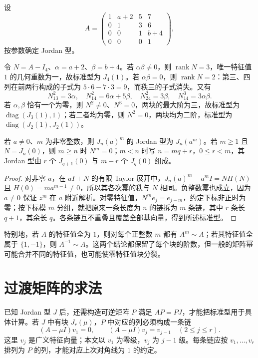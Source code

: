 \begin{example}
设
\[
 A=\begin{pmatrix}
 1&a+2&5&7\\0&1&3&6\\0&0&1&b+4\\0&0&0&1
 \end{pmatrix},
\]
按参数确定 Jordan 型。
\end{example}
\begin{solve}
令 $N=A-I_4$、$\alpha=a+2$、$\beta=b+4$。若 $\alpha\beta\ne0$，则 $\operatorname{rank}N=3$，唯一特征值 $1$ 的几何重数为一，故标准型为 $J_4(1)$。若 $\alpha\beta=0$，则 $\operatorname{rank}N=2$：第三、四列在前两行构成的子式为 $5\cdot6-7\cdot3=9$，而秩三的子式消失。又有
\[
 N^2_{13}=3\alpha,\quad N^2_{14}=6\alpha+5\beta,
 \quad N^2_{24}=3\beta,\quad N^3_{14}=3\alpha\beta.
\]
若 $\alpha,\beta$ 恰有一个为零，则 $N^2\ne0$、$N^3=0$，两块的最大阶为三，故标准型为 $\operatorname{diag}(J_3(1),1)$；若二者均为零，则 $N^2=0$，两块均为二阶，标准型为 $\operatorname{diag}(J_2(1),J_2(1))$。
\end{solve}

\begin{proposition}
\label{prop:xie-ex-sim-jordan-power}
若 $a\ne0$、$m$ 为非零整数，则 $J_n(a)^m$ 的 Jordan 型为 $J_n(a^m)$。若 $m\geq1$ 且 $N=J_n(0)$，则 $m\geq n$ 时 $N^m=0$；$m<n$ 时写 $n=mq+r$，$0\leq r<m$，其 Jordan 型由 $r$ 个 $J_{q+1}(0)$ 与 $m-r$ 个 $J_q(0)$ 组成。
\end{proposition}
\begin{proof}
对非零 $a$，在 $aI+N$ 的有限 Taylor 展开中，$J_n(a)^m-a^mI=NH(N)$ 且 $H(0)=ma^{m-1}\ne0$，所以其各次幂的秩与 $N$ 相同。负整数幂也成立，因为 $a\ne0$ 保证 $z^m$ 在 $a$ 附近解析。对零特征值，$N^me_j=e_{j-m}$，约定下标非正时为零；按下标模 $m$ 分组，就把原来一条长度为 $n$ 的链拆为 $m$ 条链，其中 $r$ 条长 $q+1$，其余长 $q$。各条链互不重叠且覆盖全部基向量，得到所述标准型。
\end{proof}

特别地，若 $A$ 的特征值全为 $1$，则对每个正整数 $m$ 都有 $A^m\sim A$；若其特征值全属于 $\{1,-1\}$，则 $A^{-1}\sim A$。这两个结论都保留了每个块的阶数，但一般的矩阵幂可能合并不同的特征值，也可能使零特征值块分裂。

\section{过渡矩阵的求法}
\label{sec:xie-ex-sim-transition}

已知 Jordan 型 $J$ 后，还需构造可逆矩阵 $P$ 满足 $AP=PJ$，才能把标准型用于具体计算。若 $J$ 中有块 $J_r(\mu)$，$P$ 中对应的列必须构成一条链
\begin{equation}
 (A-\mu I)v_1=0,\qquad
 (A-\mu I)v_j=v_{j-1}\quad(2\leq j\leq r).
 \label{eq:xie-ex-sim-chain}
\end{equation}
这里 $v_j$ 是广义特征向量；本文以 $v_1$ 为零级，$v_j$ 为 $j-1$ 级。每条链应按 $v_1,\ldots,v_r$ 排列为 $P$ 的列，才能对应上次对角线为 $1$ 的约定。

